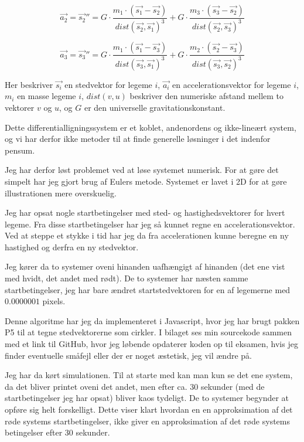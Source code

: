 \documentclass[12pt,a4paper]{article}
\theoremstyle{break}
\theoremstyle{nonumberplain}
\begin{document}
$$\vec{a_2} =  \vec{s_2}'' = G \cdot \dfrac{m_1 \cdot (\vec{s_1} - \vec{s_2})}{dist(\vec{s_2}, \vec{s_1})^3} + G \cdot \dfrac{m_3 \cdot (\vec{s_3} - \vec{s_2})}{dist(\vec{s_2}, \vec{s_3})^3}$$

$$\vec{a_3} = \vec{s_3}'' = G \cdot \dfrac{m_1 \cdot (\vec{s_1} - \vec{s_3})}{dist(\vec{s_3}, \vec{s_1})^3} + G \cdot \dfrac{m_2 \cdot (\vec{s_2} - \vec{s_3})}{dist(\vec{s_3}, \vec{s_2})^3}$$

Her beskriver $\vec{s_i}$ en stedvektor for legeme $i$, 
$\vec{a_i}$ en accelerationsvektor for legeme $i$, 
$m_i$ en masse legeme $i$,
$dist(v,u)$ beskriver den numeriske afstand mellem to vektorer $v$ og $u$, og
$G$ er den universelle gravitationskonstant.

Dette differentialligningssystem er et koblet, andenordens og ikke-lineært system, og vi har derfor ikke metoder til at finde generelle løsninger i det indenfor pensum.

Jeg har derfor løst problemet ved at løse systemet numerisk. 
For at gøre det simpelt har jeg gjort brug af Eulers metode.
Systemet er lavet i 2D for at gøre illustrationen mere overskuelig.

Jeg har opsat nogle startbetingelser med sted- og hastighedsvektorer for hvert legeme.
Fra disse startbetingelser har jeg så kunnet regne en accelerationsvektor. 
Ved at steppe et stykke i tid har jeg da fra accelerationen kunne beregne en ny hastighed og derfra en ny stedvektor.

Jeg kører da to systemer oveni hinanden uafhængigt af hinanden (det ene vist med hvidt, det andet med rødt). 
De to systemer har næsten samme startbetingelser, jeg har bare ændret startstedvektoren for en af legemerne med $0.0000001$ pixels.
 
Denne algoritme har jeg da implementeret i Javascript, hvor jeg har brugt pakken P5 til at tegne stedvektorerne som cirkler.
I bilaget ses min sourcekode sammen med et link til GitHub, hvor jeg løbende opdaterer koden op til eksamen, hvis jeg finder eventuelle småfejl eller der er noget æstetisk, jeg vil ændre på. 

Jeg har da kørt simulationen.
Til at starte med kan man kun se det ene system, da det bliver printet oveni det andet, men efter ca. 30 sekunder (med de startbetingelser jeg har opsat) bliver kaos tydeligt. 
De to systemer begynder at opføre sig helt forskelligt. 
Dette viser klart hvordan en en approksimation af det røde systems startbetingelser, ikke giver en approksimation af det røde systems betingelser efter 30 sekunder. 
\end{document}

